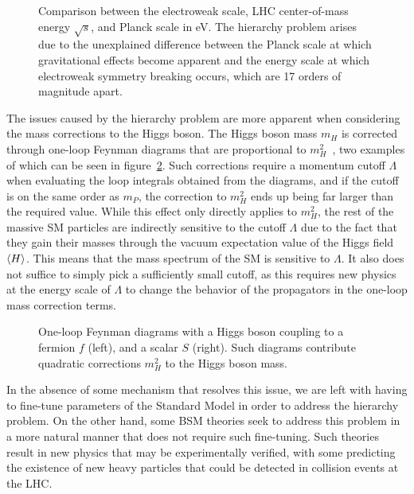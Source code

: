 \begin{figure}[htbp]
  \centering
  
  \caption{
    Comparison between the electroweak scale, LHC center-of-mass energy $\sqrt{s}$, and Planck scale in eV.
    The hierarchy problem arises due to the unexplained difference between the Planck scale at which gravitational effects become apparent and the energy scale at which electroweak symmetry breaking occurs, which are 17 orders of magnitude apart.
  }
  \label{fig:hierarchy}
\end{figure}

The issues caused by the hierarchy problem are more apparent when considering the mass corrections to the Higgs boson.
The Higgs boson mass $m_H$ is corrected through one-loop Feynman diagrams that are proportional to $m_H^2$~\cite{Martin_1998}, two examples of which can be seen in figure~\ref{fig:higgsFeyn}.
Such corrections require a momentum cutoff $\Lambda$ when evaluating the loop integrals obtained from the diagrams, and if the cutoff is on the same order as $m_P$, the correction to $m_H^2$ ends up being far larger than the required value.
While this effect only directly applies to $m_H^2$, the rest of the massive SM particles are indirectly sensitive to the cutoff $\Lambda$ due to the fact that they gain their masses through the vacuum expectation value of the Higgs field $\ev{H}$.
This means that the mass spectrum of the SM is sensitive to $\Lambda$.
It also does not suffice to simply pick a sufficiently small cutoff, as this requires new physics at the energy scale of $\Lambda$ to change the behavior of the propagators in the one-loop mass correction terms.

\begin{figure}[htbp]
  \centering
  
  \caption{
    One-loop Feynman diagrams with a Higgs boson coupling to a fermion $f$ (left), and a scalar $S$ (right).
    Such diagrams contribute quadratic corrections $m_H^2$ to the Higgs boson mass.
  }
  \label{fig:higgsFeyn}
\end{figure}

In the absence of some mechanism that resolves this issue, we are left with having to fine-tune parameters of the Standard Model in order to address the hierarchy problem.
On the other hand, some BSM theories seek to address this problem in a more natural manner that does not require such fine-tuning.
Such theories result in new physics that may be experimentally verified, with some predicting the existence of new heavy particles that could be detected in collision events at the LHC.

